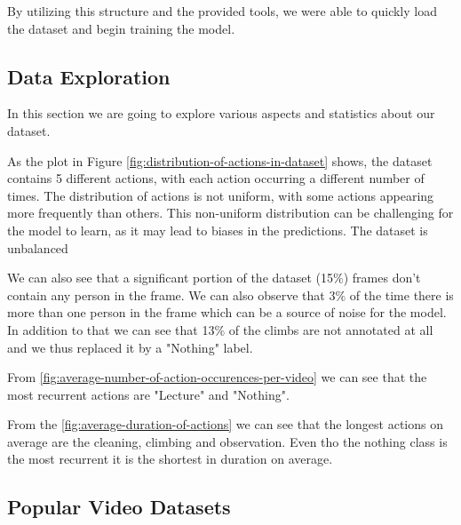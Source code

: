 By utilizing this structure and the provided tools, we were able to quickly load the dataset and begin training the model.

\subsection{Data Exploration}

In this section we are going to explore various aspects and statistics about our dataset.

As the plot in Figure \ref{fig:distribution-of-actions-in-dataset} shows, the dataset contains 5 different actions, with each action occurring a different number of times. The distribution of actions is not uniform, with some actions appearing more frequently than others. This non-uniform distribution can be challenging for the model to learn, as it may lead to biases in the predictions. The dataset is unbalanced


We can also see that a significant portion of the dataset (15\%) frames don't contain any person in the frame. We can also observe that 3\% of the time there is more than one person in the frame which can be a source of noise for the model.
In addition to that we can see that 13\% of the climbs are not annotated at all and we thus replaced it by a "Nothing" label.

From \ref{fig:average-number-of-action-occurences-per-video} we  can see that the most recurrent actions are "Lecture" and "Nothing".

From the \ref{fig:average-duration-of-actions} we can see that the longest actions on average are the cleaning, climbing and observation. Even tho the nothing class is the most recurrent it is the shortest in duration on average.

\subsection{Popular Video Datasets}

\label{subsection:popular-video-datasets}

